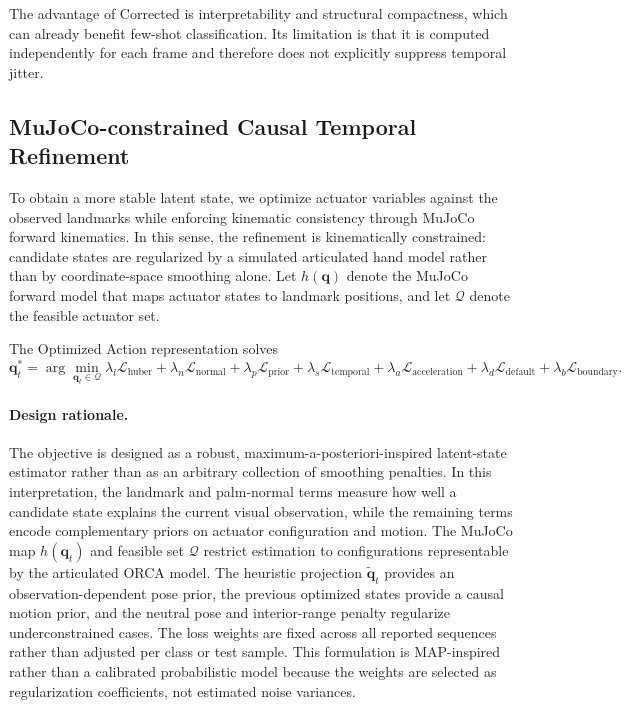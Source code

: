 \documentclass[11pt]{article}
\begin{document}
The advantage of Corrected is interpretability and structural compactness, which can already benefit few-shot classification. Its limitation is that it is computed independently for each frame and therefore does not explicitly suppress temporal jitter.

\subsection{MuJoCo-constrained Causal Temporal Refinement}
To obtain a more stable latent state, we optimize actuator variables against the observed landmarks while enforcing kinematic consistency through MuJoCo forward kinematics. In this sense, the refinement is kinematically constrained: candidate states are regularized by a simulated articulated hand model rather than by coordinate-space smoothing alone. Let $h(\mathbf{q})$ denote the MuJoCo forward model that maps actuator states to landmark positions, and let $\mathcal{Q}$ denote the feasible actuator set.

The Optimized Action representation solves
\[
\mathbf{q}_t^*
=
\arg\min_{\mathbf{q}_t \in \mathcal{Q}}
\lambda_l \mathcal{L}_{\text{huber}}
+ \lambda_n \mathcal{L}_{\text{normal}}
+ \lambda_p \mathcal{L}_{\text{prior}}
+ \lambda_s \mathcal{L}_{\text{temporal}}
+ \lambda_a \mathcal{L}_{\text{acceleration}}
+ \lambda_d \mathcal{L}_{\text{default}}
+ \lambda_b \mathcal{L}_{\text{boundary}}.
\]

\paragraph{Design rationale.}
The objective is designed as a robust, maximum-a-posteriori-inspired latent-state estimator rather than as an arbitrary collection of smoothing penalties. In this interpretation, the landmark and palm-normal terms measure how well a candidate state explains the current visual observation, while the remaining terms encode complementary priors on actuator configuration and motion. The MuJoCo map $h(\mathbf q_t)$ and feasible set $\mathcal Q$ restrict estimation to configurations representable by the articulated ORCA model. The heuristic projection $\tilde{\mathbf q}_t$ provides an observation-dependent pose prior, the previous optimized states provide a causal motion prior, and the neutral pose and interior-range penalty regularize underconstrained cases. The loss weights are fixed across all reported sequences rather than adjusted per class or test sample. This formulation is MAP-inspired rather than a calibrated probabilistic model because the weights are selected as regularization coefficients, not estimated noise variances.
\end{document}
